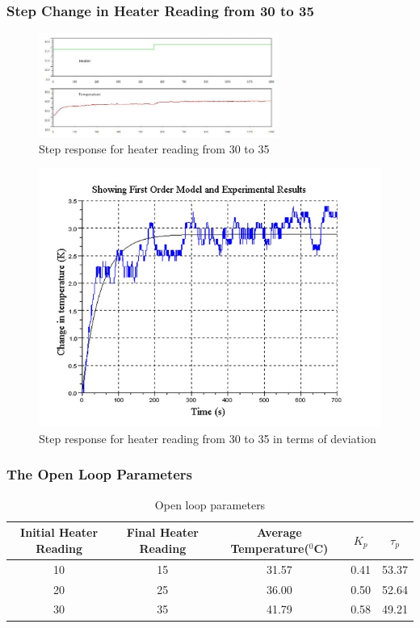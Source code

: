 \subsubsection{Step Change in Heater Reading from 30 to 35}
%
\begin{figure}[h]
\centering
	\includegraphics[width = 0.7\textwidth]{Vikas_self/report_tex/parameter_estimation/30to35.jpg}
		\caption{Step response for heater reading from 30 to 35}
	\label{fig:30to35}
\end{figure}
%
\begin{figure}[h]
\centering
	\includegraphics[width = .75\textwidth]{Vikas_self/report_tex/parameter_estimation/optimized30to35.jpg}
		\caption{Step response for heater reading from 30 to 35 in terms of deviation}
	\label{optimized30to35}
\end{figure}

\newpage
\subsubsection{The Open Loop Parameters}
\begin{table}[h]
	\begin{tabular}{|c|c|c|c|c|}\hline
	Initial Heater Reading&Final Heater Reading&Average Temperature($^0$C)&$K_p$&$\tau_p$\\ \hline \hline
	10	&15	&31.57	&0.41	&53.37\\ \hline
	20	&25	&36.00	&0.50	&52.64\\ \hline
	30	&35	&41.79	&0.58	&49.21\\ \hline
		
	\end{tabular}
	\caption{Open loop parameters}
	\label{tab:OpenLoopParameters}
\end{table}

